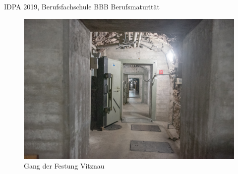 \begin{titlepage}
	\vfill\vfill\vfill %
	
	{\large IDPA 2019, Berufsfachschule BBB Berufsmaturität} %
	
	
	\vfill\vfill
	\begin{figure}[h]
		\includegraphics[width=1\textwidth]{images/Fotos_Vitznau_085.jpg} %
		\caption[{Seya Schmassmann (2019). Gang der Festung Vitznau (27. April 2019). [Stand 24.08.2019] }] {Gang der Festung Vitznau}
	\end{figure}
		
	
	\vfill %
	
\end{titlepage}